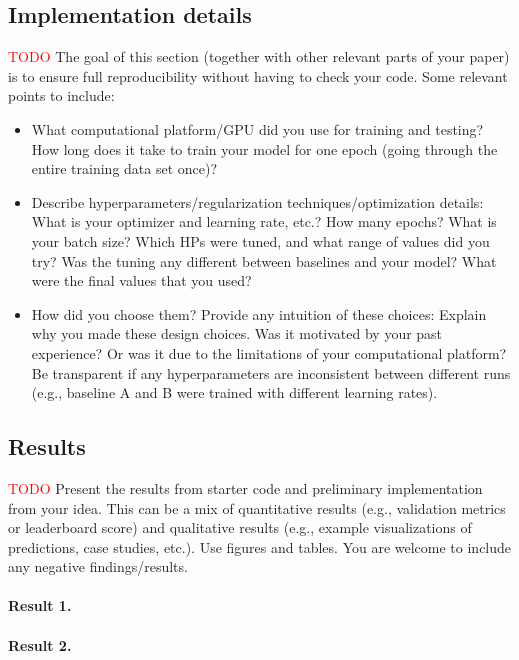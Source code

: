 \documentclass{article}
\begin{document}
\subsection{Implementation details}
\label{sec:implementation_details}
\textcolor{red}{TODO} The goal of this section (together with other relevant parts of your paper) is to ensure full reproducibility without having to check your code.
Some relevant points to include:
\begin{itemize}
    \item What computational platform/GPU did you use for training and testing? How long does it take to train your model for one epoch (going through the entire training data set once)?
    \item Describe hyperparameters/regularization techniques/optimization details: What is your optimizer and learning rate, etc.? How many epochs? What is your batch size? Which HPs were tuned, and what range of values did you try? Was the tuning any different between baselines and your model? What were the final values that you used?
    \item  How did you choose them? Provide any intuition of these choices: Explain why you made these design choices. Was it motivated by your past experience? Or was it due to the limitations of your computational platform? Be transparent if any hyperparameters are inconsistent between different runs (e.g., baseline A and B were trained with different learning rates). 
\end{itemize}
% 
\subsection{Results}
\label{sec:results}
\textcolor{red}{TODO} Present the results from starter code and preliminary implementation from your idea. This can be a mix of quantitative results (e.g., validation metrics or leaderboard score) and qualitative results (e.g., example visualizations of predictions, case studies, etc.). Use figures and tables. You are welcome to include any negative findings/results.
\paragraph{Result 1.}
\paragraph{Result 2.}
% 
% 
\end{document}
